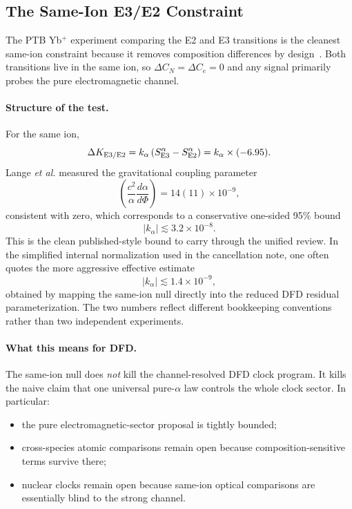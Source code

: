 \subsection{The Same-Ion E3/E2 Constraint}\label{sec:clocks-e3e2}

The PTB Yb$^+$ experiment comparing the E2 and E3 transitions is the cleanest same-ion constraint because it removes composition differences by design~\cite{Lange2021}.  Both transitions live in the same ion, so $\Delta C_N=\Delta C_e=0$ and any signal primarily probes the pure electromagnetic channel.

\paragraph{Structure of the test.}
For the same ion,
\begin{equation}
\Delta K_{\rm E3/E2}=k_\alpha\,(S_{\rm E3}^\alpha-S_{\rm E2}^\alpha)=k_\alpha\times(-6.95).
\end{equation}
Lange \emph{et al.} measured the gravitational coupling parameter
\begin{equation}
\left(\frac{c^2}{\alpha}\frac{d\alpha}{d\Phi}\right)=14(11)\times10^{-9},
\end{equation}
consistent with zero, which corresponds to a conservative one-sided 95\% bound
\begin{equation}\label{eq:kalpha-bound-conservative}
|k_\alpha|\lesssim 3.2\times10^{-8}.
\end{equation}
This is the clean published-style bound to carry through the unified review.  In the simplified internal normalization used in the cancellation note, one often quotes the more aggressive effective estimate
\begin{equation}\label{eq:kalpha-bound-aggressive}
|k_\alpha|\lesssim 1.4\times10^{-9},
\end{equation}
obtained by mapping the same-ion null directly into the reduced DFD residual parameterization.  The two numbers reflect different bookkeeping conventions rather than two independent experiments.

\paragraph{What this means for DFD.}
The same-ion null does \emph{not} kill the channel-resolved DFD clock program.  It kills the naive claim that one universal pure-$\alpha$ law controls the whole clock sector.  In particular:
\begin{itemize}
\item the pure electromagnetic-sector proposal is tightly bounded;
\item cross-species atomic comparisons remain open because composition-sensitive terms survive there;
\item nuclear clocks remain open because same-ion optical comparisons are essentially blind to the strong channel.
\end{itemize}

